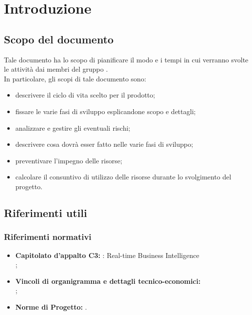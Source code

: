 \section{Introduzione}

	\subsection{Scopo del documento}
		Tale documento ha lo scopo di pianificare il modo e i tempi in cui verranno svolte le attività dai membri del gruppo \groupname{}.\\
		In particolare, gli scopi di tale documento sono:
		\begin{itemize}
			\item descrivere il ciclo di vita scelto per il prodotto;
			\item fissare le varie fasi di sviluppo esplicandone scopo e dettagli;
			\item analizzare e gestire gli eventuali rischi;
			\item descrivere cosa dovrà esser fatto nelle varie fasi di sviluppo;
			\item preventivare l'impegno delle risorse;
			\item calcolare il consuntivo di utilizzo delle risorse durante lo svolgimento del progetto.
		\end{itemize}
	
		

	\subsection{Riferimenti utili}
		\subsubsection{Riferimenti normativi}
			\begin{itemize}
				\item \textbf{Capitolato d'appalto C3:} \projectname{}: Real-time Business Intelligence \\
					;
				\item \textbf{Vincoli di organigramma e dettagli tecnico-economici:} \\
					;
				\item \textbf{Norme di Progetto:} .
			\end{itemize}

